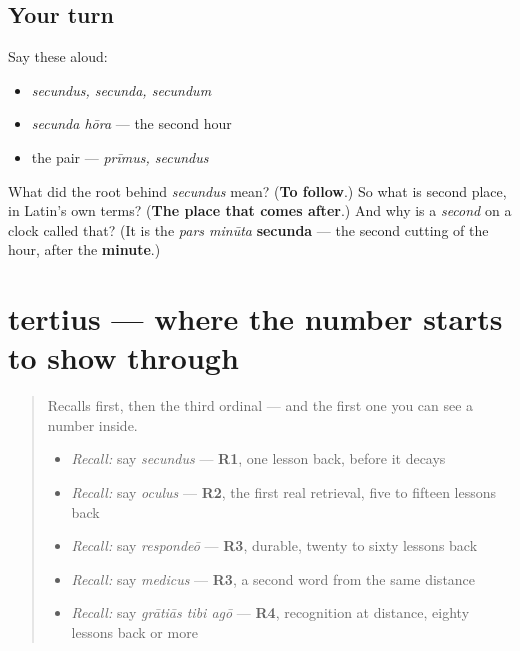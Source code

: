 \subsection*{Your turn}
Say these aloud:

\begin{itemize}
\raggedright
  \item \emph{secundus, secunda, secundum}
  \item \emph{secunda hōra} — the second hour
  \item the pair — \emph{prīmus, secundus}
\end{itemize}

\begin{tcolorbox}[breakable,colback=teal!4,colframe=teal!35!black,title={Before you move on}]
What did the root behind \emph{secundus} mean? (\textbf{To follow}.) So what is second place, in Latin's own terms? (\textbf{The place that comes after}.) And why is a \emph{second} on a clock called that? (It is the \emph{pars minūta} \textbf{secunda} — the second cutting of the hour, after the \textbf{minute}.)
\end{tcolorbox}
\section[tertius, tertia, tertium]{tertius — where the number starts to show through}

\label{lesson:LA-C55-tertius}



\begin{quote}
Recalls first, then the third ordinal — and the first one you can see a number inside.

\begin{itemize}
\raggedright
  \item \emph{Recall:} say \emph{secundus} — \textbf{R1}, one lesson back, before it decays
  \item \emph{Recall:} say \emph{oculus} — \textbf{R2}, the first real retrieval, five to fifteen lessons back
  \item \emph{Recall:} say \emph{respondeō} — \textbf{R3}, durable, twenty to sixty lessons back
  \item \emph{Recall:} say \emph{medicus} — \textbf{R3}, a second word from the same distance
  \item \emph{Recall:} say \emph{grātiās tibi agō} — \textbf{R4}, recognition at distance, eighty lessons back or more
\end{itemize}
\end{quote}


